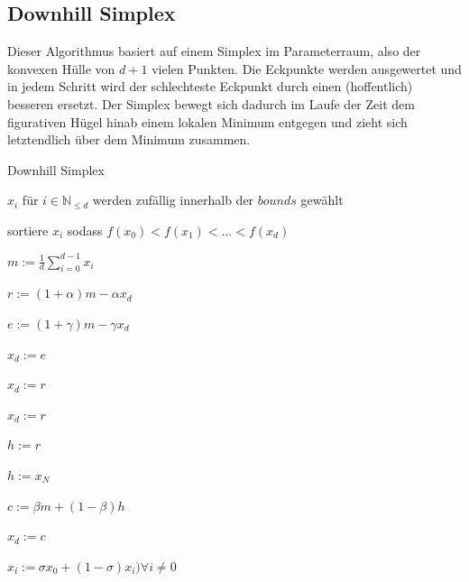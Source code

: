 \documentclass[a4paper,12pt]{article}
\begin{document}
\subsection{Downhill Simplex}

Dieser Algorithmus basiert auf einem Simplex im Parameterraum, also der konvexen Hülle von $d+1$ vielen Punkten. Die Eckpunkte werden ausgewertet und in jedem Schritt wird der schlechteste Eckpunkt durch einen (hoffentlich) besseren ersetzt. Der Simplex bewegt sich dadurch im Laufe der Zeit dem figurativen Hügel hinab einem lokalen Minimum entgegen und zieht sich letztendlich über dem Minimum zusammen.

\begin{algorithm}
\caption{Downhill Simplex}
\begin{algorithmic}

\State $x_i$ für $i \in \mathbb{N}_{\leq d}$ werden zufällig innerhalb der $bounds$ gewählt


\State sortiere $x_i$ sodass $f(x_0) < f(x_1) < \hdots < f(x_d)$

\State $m := \frac{1}{d} \sum^{d-1}_{i = 0} x_i$ 

\State $r := (1+\alpha)m - \alpha x_d$ 


\State $e := (1+\gamma)m - \gamma x_d$ 


\State $x_d := e$

\Else

\State $x_d := r$

\EndIf


\State $x_d := r$

\Else


\State $h := r$

\Else

\State $h := x_N$

\EndIf

\State $c := \beta m  + (1-\beta) h$

 

\State $x_d := c$

\Else

\State $x_i := \sigma x_0 + (1-\sigma) x_i) \forall i \neq 0$ 

\EndIf

\EndIf

\EndFor
\EndFunction	
\end{algorithmic}
\end{algorithm}
\end{document}
